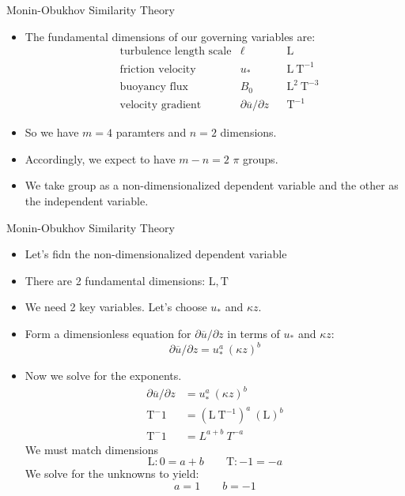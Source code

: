\begin{frame}{Monin-Obukhov Similarity Theory}
	\begin{itemize}
		\item The fundamental dimensions of our governing variables are:
	\begin{align*}
	&\text{turbulence length scale} & \ell & &\mathrm{L}\\
	&\text{friction velocity} & u_*  & &\mathrm{L\ T^{-1}}\\
	&\text{buoyancy flux}     & B_0  & &\mathrm{L^2\ T^{-3}}\\
	&\text{velocity gradient} & \partial \overline{u}/\partial z  & &\mathrm{T^{-1}}
	\end{align*}
	\item So we have $m=4$ paramters and $n=2$ dimensions.
	\item Accordingly, we expect to have $m-n=2$ $\pi$ groups.
	\item We take group as a non-dimensionalized dependent variable and the other as the independent variable.
	\end{itemize}
\end{frame}
\begin{frame}{Monin-Obukhov Similarity Theory}
	\begin{itemize}
		\item Let's fidn the non-dimensionalized dependent variable
		\item There are 2 fundamental dimensions: $\mathrm{L, T}$
		\item We need 2 key variables. Let's choose $u_*$ and $\kappa z$.
	\item Form a dimensionless equation for $\partial \overline{u} /\partial z$ in terms of $u_*$ and $\kappa z$: 
	$$ \partial \overline{u} /\partial z= u_*^a\ (\kappa z)^b$$
	\item Now we solve for the exponents.
	\begin{align*}
	\partial \overline{u} /\partial z &= u_*^a\ (\kappa z)^b\\
	\mathrm{T^-1} &= (\mathrm{L\ T^{-1}})^a\ (\mathrm{L})^b\\
	\mathrm{T^-1} &= L^{a+b}\ T^{-a}
	\end{align*}
	We must match dimensions
	$$\mathrm{L}: 0 = a+b \qquad \mathrm{T}: -1 = -a$$
	We solve for the unknowns to yield:
	$$a=1 \qquad b=-1$$
	\end{itemize}
\end{frame}
